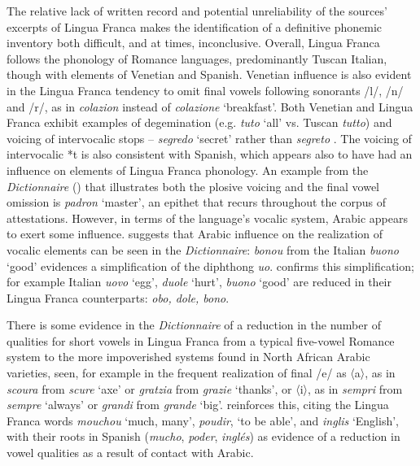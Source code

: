 \documentclass[output=paper]{langsci/langscibook}
\begin{document}
	The relative lack of written record and potential unreliability of the sources’ excerpts of Lingua Franca makes the identification of a definitive phonemic inventory both difficult, and at times, inconclusive. Overall, Lingua Franca follows the phonology of Romance languages, predominantly Tuscan Italian, though with elements of Venetian and Spanish. Venetian influence is also evident in the Lingua Franca tendency to omit final vowels following sonorants /l/, /n/ and /r/, as in \textit{colazion} instead of \textit{colazione} ‘breakfast’. Both Venetian and Lingua Franca exhibit examples of degemination (e.g. \textit{tuto} `all' vs. Tuscan \textit{tutto}) and voicing of intervocalic stops – \textit{segredo} `secret' rather than \textit{segreto} \citep{Ursini2011}. The voicing of intervocalic *t is also consistent with Spanish, which appears also to have had an influence on elements of Lingua Franca phonology. An example from the \textit{Dictionnaire} (\citeyear[63]{Anonymous1830}) that illustrates both the plosive voicing and the final vowel omission is \textit{padron} ‘master’, an epithet that recurs throughout the corpus of attestations. However, in terms of the language’s vocalic system, Arabic appears to exert some influence. \citet{Cifoletti2004} suggests that Arabic influence on the realization of vocalic elements can be seen in the \textit{Dictionnaire}: \textit{bonou} from the Italian \textit{buono} ‘good’ evidences a simplification of the diphthong \textit{uo}. \citet[444]{Bergareche1993} confirms this simplification; for example Italian \textit{uovo} ‘egg’, \textit{duole} ‘hurt’, \textit{buono} ‘good’ are reduced in their Lingua Franca counterparts: \textit{obo, dole, bono}. 
	
	There is some evidence in the \textit{Dictionnaire} of a reduction in the number of qualities for short vowels in Lingua Franca from a typical five-vowel Romance system to the more impoverished systems found in North African Arabic varieties, seen, for example in the frequent realization of final /e/ as 〈a〉, as in \textit{scoura} from \textit{scure} ‘axe’ or \textit{gratzia} from \textit{grazie} ‘thanks’, or 〈i〉, as in \textit{sempri} from \textit{sempre} ‘always’ or \textit{grandi} from \textit{grande} ‘big’. \citet[444]{Bergareche1993} reinforces this, citing the Lingua Franca words \textit{mouchou} ‘much, many’, \textit{poudir}, ‘to be able’, and \textit{inglis} ‘English’, with their roots in Spanish (\textit{mucho}, \textit{poder}, \textit{inglés}) as evidence of a reduction in vowel qualities as a result of contact with Arabic. 
	
\end{document}
